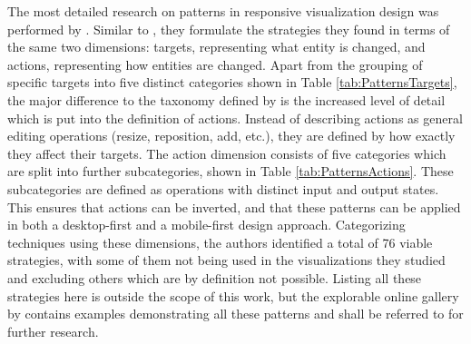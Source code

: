 The most detailed research on patterns in responsive visualization design was performed by \cite{DesignPatternsTradeOffsRespVis}.
Similar to \cite{TechniquesForFlexibleRespVisDesign}, they formulate the strategies they found in terms of the same two dimensions: targets, representing what entity is changed, and actions, representing how entities are changed.
Apart from the grouping of specific targets into five distinct categories shown in Table \ref{tab:PatternsTargets}, the major difference to the taxonomy defined by \cite{TechniquesForFlexibleRespVisDesign} is the increased level of detail which is put into the definition of actions.
Instead of describing actions as general editing operations (resize, reposition, add, etc.), they are defined by how exactly they affect their targets.
The action dimension consists of five categories which are split into further subcategories, shown in Table \ref{tab:PatternsActions}.
These subcategories are defined as operations with distinct input and output states.
This ensures that actions can be inverted, and that these patterns can be applied in both a desktop-first and a mobile-first design approach.
Categorizing techniques using these dimensions, the authors identified a total of 76 viable strategies, with some of them not being used in the visualizations they studied and excluding others which are by definition not possible.
Listing all these strategies here is outside the scope of this work, but the explorable online gallery by \cite{DesignPatternsTradeOffsRespVisGallery} contains examples demonstrating all these patterns and shall be referred to for further research.

